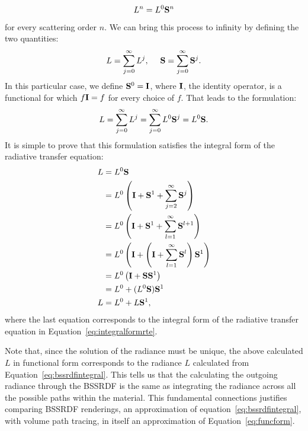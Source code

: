 \begin{equation*}
L^n = L^0 \mathbf{S}^n
\end{equation*}
for every scattering order $n$.
We can bring this process to infinity by defining the two quantities:
\begin{equation*}
L = \sum_{j=0}^\infty L^j,\ \ \ \ \operator{S} = \sum_{j=0}^\infty \operator{S}^j.
\end{equation*}
In this particular case, we define $\mathbf{S}^0 = \mathbf{I}$, where $\mathbf{I}$, the identity operator, is a functional for which $f \mathbf{I} = f$ for every choice of $f$.
That leads to the formulation:
\begin{equation}
\label{eq:funcform}
L =  \sum_{j=0}^\infty L^j = \sum_{j=0}^\infty L^0 \mathbf{S}^j = L^0 \mathbf{S}.
\end{equation}
It is simple to prove that this formulation satisfies the integral form of the radiative transfer equation:
\begin{equation*}
\begin{split}
L &= L^0 \mathbf{S} \\
&= L^0 \left(\mathbf{I} + \mathbf{S}^1 + \sum_{j=2}^\infty \mathbf{S}^j \right) \\
&= L^0 \left( \mathbf{I} + \mathbf{S}^1 + \sum_{l=1}^\infty \mathbf{S}^{l+1} \right) \\
&= L^0 \left( \mathbf{I} + \left( \mathbf{I} + \sum_{l=1}^\infty \mathbf{S}^l \right) \mathbf{S}^1 \right)  \\
&= L^0 \left( \mathbf{I} + \mathbf{S} \mathbf{S}^1 \right)  \\
&= L^0 + (L^0 \mathbf{S}) \mathbf{S}^1   \\
L &= L^0 + L \mathbf{S}^1,   \\
\end{split}
\end{equation*}
where the last equation corresponds to the integral form of the radiative transfer equation in Equation~\ref{eq:integralformrte}.

Note that, since the solution of the radiance must be unique, the above calculated $L$ in functional form corresponds to the radiance $L$ calculated from Equation~\ref{eq:bssrdfintegral}. This tells us that the calculating the outgoing radiance through the BSSRDF is the same as integrating the radiance across all the possible paths within the material. This fundamental connections justifies comparing BSSRDF renderings, an approximation of equation~\ref{eq:bssrdfintegral}, with volume path tracing, in itself an approximation of Equation~\ref{eq:funcform}.

